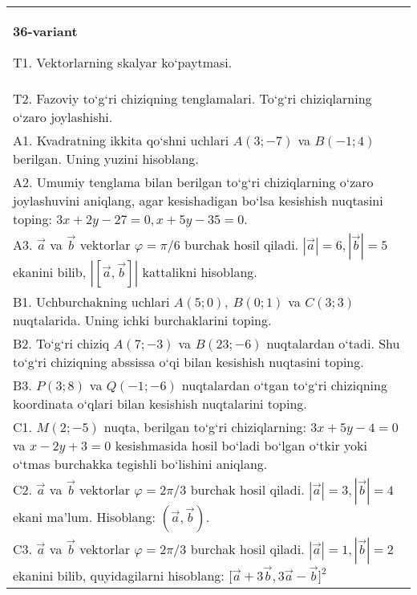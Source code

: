 \documentclass{article}
\begin{document}
\begin{tabular}{m{17cm}}
\textbf{36-variant}

T1. 
Vektorlarning skalyar ko‘paytmasi.
 \\
T2. 
Fazoviy to‘g‘ri chiziqning tenglamalari. To‘g‘ri chiziqlarning o‘zaro joylashishi.
 \\
A1. 
Kvadratning ikkita qo‘shni uchlari $A (3; -7)$ va
$B (-1;4) $ berilgan. Uning yuzini hisoblang.
 \\
A2. 
Umumiy tenglama bilan berilgan to‘g‘ri chiziqlarning
o‘zaro joylashuvini aniqlang, agar kesishadigan bo‘lsa kesishish nuqtasini
toping: $3x+2y-27=0, x+5y-35=0$.
 \\
A3. 
$\overrightarrow{a}$ va $\overrightarrow{b}$ vektorlar
$\varphi = \pi/6$ burchak hosil qiladi.
$|\overrightarrow{a}| = 6,|\overrightarrow{b}| = 5$ ekanini bilib,
$\left| \left\lbrack \overrightarrow{a},\overrightarrow{b} \right\rbrack \right|$ kattalikni hisoblang.
 \\
B1. 
Uchburchakning uchlari \(A (5;0),\ B (0;1) \) va \(C (3;3) \)
nuqtalarida. Uning ichki burchaklarini toping.
 \\
B2. 
To‘g‘ri chiziq \(A (7;-3) \) va \(B (23;-6) \) nuqtalardan o‘tadi.
Shu to‘g‘ri chiziqning abssissa o‘qi bilan kesishish nuqtasini toping.
 \\
B3. 
\(P (3;8) \) va \(Q (-1;-6) \) nuqtalardan o‘tgan
to‘g‘ri chiziqning koordinata o‘qlari bilan kesishish nuqtalarini toping.
 \\
C1. 
\(M (2;-5) \) nuqta, berilgan to‘g‘ri chiziqlarning:
\(3x+5y-4=0\) va \(x-2y+3=0\) kesishmasida hosil bo‘ladi
bo‘lgan o‘tkir yoki o‘tmas burchakka tegishli bo‘lishini aniqlang.
 \\
C2. 
$\vec{a}$ va $\vec{b}$ vektorlar $\varphi = 2\pi/3$ burchak hosil qiladi. $|\vec{a}| = 3,|\vec{b}| = 4$ ekani ma’lum. Hisoblang:
$\left(\vec{a},\vec{b} \right) $.
 \\
C3. 
$\vec{a}$ va $\vec{b}$ vektorlar $\varphi = 2\pi/3$ burchak hosil qiladi. $|\vec{a}| = 1,|\vec{b}| = 2$ ekanini bilib, quyidagilarni hisoblang:
$\lbrack\overrightarrow{a} + 3\overrightarrow{b},3\overrightarrow{a} - \overrightarrow{b}\rbrack^{2}$
 \\

\end{tabular}
\vspace{1cm}
\end{document}
